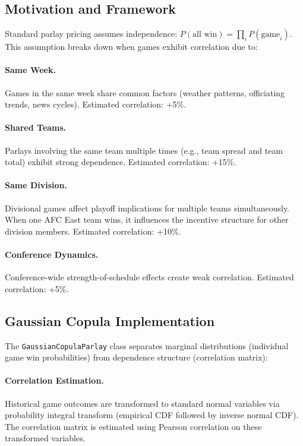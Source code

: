 \subsection{Motivation and Framework}
Standard parlay pricing assumes independence: $P(\text{all win}) = \prod_i P(\text{game}_i)$. This assumption breaks down when games exhibit correlation due to:

\paragraph{Same Week.}
Games in the same week share common factors (weather patterns, officiating trends, news cycles). Estimated correlation: +5\%.

\paragraph{Shared Teams.}
Parlays involving the same team multiple times (e.g., team spread and team total) exhibit strong dependence. Estimated correlation: +15\%.

\paragraph{Same Division.}
Divisional games affect playoff implications for multiple teams simultaneously. When one AFC East team wins, it influences the incentive structure for other division members. Estimated correlation: +10\%.

\paragraph{Conference Dynamics.}
Conference-wide strength-of-schedule effects create weak correlation. Estimated correlation: +5\%.

\subsection{Gaussian Copula Implementation}
The \texttt{GaussianCopulaParlay} class separates marginal distributions (individual game win probabilities) from dependence structure (correlation matrix):

\paragraph{Correlation Estimation.}
Historical game outcomes are transformed to standard normal variables via probability integral transform (empirical CDF followed by inverse normal CDF). The correlation matrix is estimated using Pearson correlation on these transformed variables.

